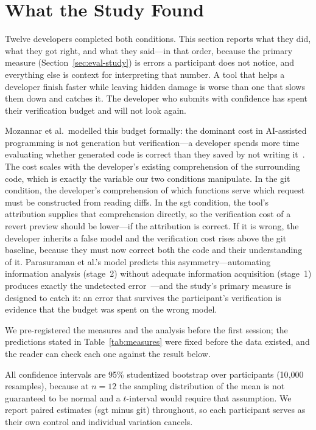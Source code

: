 \section{What the Study Found}
\label{sec:findings}

Twelve developers completed both conditions. This section reports what they did,
what they got right, and what they said---in that order, because the primary
measure (Section~\ref{sec:eval-study}) is errors a participant does not notice,
and everything else is context for interpreting that number. A tool that helps a
developer finish faster while leaving hidden damage is worse than one that slows
them down and catches it. The developer who submits with confidence has
spent their verification budget and will not look again.

Mozannar et al.\ modelled this budget formally: the dominant cost in AI-assisted
programming is not generation but verification---a developer spends more time
evaluating whether generated code is correct than they saved by not writing
it~\cite{mozannar2024}. The cost scales with the developer's existing
comprehension of the surrounding code, which is exactly the variable our two
conditions manipulate. In the git condition, the developer's comprehension of
which functions serve which request must be constructed from reading diffs. In
the sgt condition, the tool's attribution supplies that comprehension directly,
so the verification cost of a revert preview should be lower---if the attribution
is correct. If it is wrong, the developer inherits a false model and the
verification cost rises above the git baseline, because they must now correct
both the code and their understanding of it. Parasuraman et al.'s model predicts
this asymmetry---automating information analysis (stage~2) without adequate
information acquisition (stage~1) produces exactly the undetected
error~\cite{parasuraman2000}---and the study's primary measure is designed to
catch it: an error that survives the participant's verification is evidence that
the budget was spent on the wrong model.

We pre-registered the measures and the analysis before the first session; the
predictions stated in Table~\ref{tab:measures} were fixed before the data
existed, and the reader can check each one against the result below.

All confidence intervals are 95\% studentized bootstrap over participants
(10{,}000 resamples), because at $n=12$ the sampling distribution of the mean
is not guaranteed to be normal and a $t$-interval would require that assumption.
We report paired estimates (sgt minus git) throughout, so each participant
serves as their own control and individual variation cancels.

